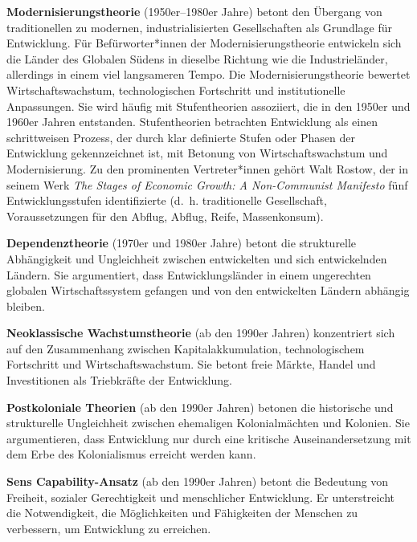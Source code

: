 \documentclass[
  nswissgerman,
  a4paper,
  openany]{book}
\begin{document}
\endgroup{}

\begin{tcolorbox}[enhanced jigsaw, arc=.35mm, bottomrule=.15mm, bottomtitle=1mm, breakable, colback=white, colbacktitle=quarto-callout-note-color!10!white, colframe=quarto-callout-note-color-frame, coltitle=black, left=2mm, leftrule=.75mm, opacityback=0, opacitybacktitle=0.6, rightrule=.15mm, title={Entwicklungstheorien}, titlerule=0mm, toprule=.15mm, toptitle=1mm]

\textbf{Modernisierungstheorie} (1950er--1980er Jahre) betont den
Übergang von traditionellen zu modernen, industrialisierten
Gesellschaften als Grundlage für Entwicklung. Für Befürworter*innen der
Modernisierungstheorie entwickeln sich die Länder des Globalen Südens in
dieselbe Richtung wie die Industrieländer, allerdings in einem viel
langsameren Tempo. Die Modernisierungstheorie bewertet
Wirtschaftswachstum, technologischen Fortschritt und institutionelle
Anpassungen. Sie wird häufig mit Stufentheorien assoziiert, die in den
1950er und 1960er Jahren entstanden. Stufentheorien betrachten
Entwicklung als einen schrittweisen Prozess, der durch klar definierte
Stufen oder Phasen der Entwicklung gekennzeichnet ist, mit Betonung von
Wirtschaftswachstum und Modernisierung. Zu den prominenten
Vertreter*innen gehört Walt Rostow, der in seinem Werk \emph{The Stages
of Economic Growth: A Non-Communist Manifesto} fünf Entwicklungsstufen
identifizierte (d.~h. traditionelle Gesellschaft, Voraussetzungen für
den Abflug, Abflug, Reife, Massenkonsum).

\textbf{Dependenztheorie} (1970er und 1980er Jahre) betont die
strukturelle Abhängigkeit und Ungleichheit zwischen entwickelten und
sich entwickelnden Ländern. Sie argumentiert, dass Entwicklungsländer in
einem ungerechten globalen Wirtschaftssystem gefangen und von den
entwickelten Ländern abhängig bleiben.

\textbf{Neoklassische Wachstumstheorie} (ab den 1990er Jahren)
konzentriert sich auf den Zusammenhang zwischen Kapitalakkumulation,
technologischem Fortschritt und Wirtschaftswachstum. Sie betont freie
Märkte, Handel und Investitionen als Triebkräfte der Entwicklung.

\textbf{Postkoloniale Theorien} (ab den 1990er Jahren) betonen die
historische und strukturelle Ungleichheit zwischen ehemaligen
Kolonialmächten und Kolonien. Sie argumentieren, dass Entwicklung nur
durch eine kritische Auseinandersetzung mit dem Erbe des Kolonialismus
erreicht werden kann.

\textbf{Sens Capability-Ansatz} (ab den 1990er Jahren) betont die
Bedeutung von Freiheit, sozialer Gerechtigkeit und menschlicher
Entwicklung. Er unterstreicht die Notwendigkeit, die Möglichkeiten und
Fähigkeiten der Menschen zu verbessern, um Entwicklung zu erreichen.


\end{tcolorbox}
\end{document}

